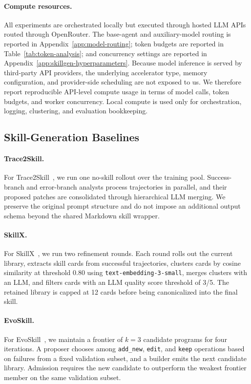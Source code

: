 \documentclass{article}
\begin{document}
\paragraph{Compute resources.}
All experiments are orchestrated locally but executed through hosted LLM APIs routed through OpenRouter. The base-agent and auxiliary-model routing is reported in Appendix~\ref{app:model-routing}; token budgets are reported in Table~\ref{tab:token-analysis}; and concurrency settings are reported in Appendix~\ref{app:skillgen-hyperparameters}. Because model inference is served by third-party API providers, the underlying accelerator type, memory configuration, and provider-side scheduling are not exposed to us. We therefore report reproducible API-level compute usage in terms of model calls, token budgets, and worker concurrency. Local compute is used only for orchestration, logging, clustering, and evaluation bookkeeping.

\subsection{Skill-Generation Baselines}
\label{app:baseline-details}

\paragraph{Trace2Skill.}
For Trace2Skill~\citep{ni2026trace2skill}, we run one no-skill rollout over the training pool. Success-branch and error-branch analysts process trajectories in parallel, and their proposed patches are consolidated through hierarchical LLM merging. We preserve the original prompt structure and do not impose an additional output schema beyond the shared Markdown skill wrapper.

\paragraph{SkillX.}
For SkillX~\citep{wang2026skillx}, we run two refinement rounds. Each round rolls out the current library, extracts skill cards from successful trajectories, clusters cards by cosine similarity at threshold 0.80 using \texttt{text-embedding-3-small}, merges clusters with an LLM, and filters cards with an LLM quality score threshold of 3/5. The retained library is capped at 12 cards before being canonicalized into the final skill.

\paragraph{EvoSkill.}
For EvoSkill~\citep{alzubi2026evoskill}, we maintain a frontier of $k=3$ candidate programs for four iterations. A proposer chooses among \texttt{add\_new}, \texttt{edit}, and \texttt{keep} operations based on failures from a fixed validation subset, and a builder emits the next candidate library. Admission requires the new candidate to outperform the weakest frontier member on the same validation subset.
\end{document}
